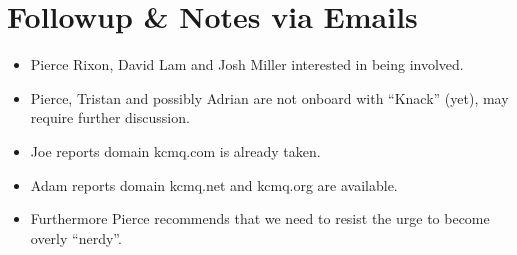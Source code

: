 \section{Followup \& Notes via Emails}
\label{sec:Followup}
\begin{itemize}
  \item Pierce Rixon, David Lam and Josh Miller interested in being involved.
  \item Pierce, Tristan and possibly Adrian are not onboard with ``Knack''
  (yet), may require further discussion.
  \item Joe reports domain kcmq.com is already taken.
  \item Adam reports domain kcmq.net and kcmq.org are available.
  \item Furthermore Pierce recommends that we need to resist the urge to become
  overly ``nerdy''.
\end{itemize}